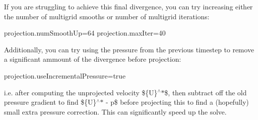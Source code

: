 If you are struggling to achieve this final divergence, you can try increasing either the number of multigrid smooths or number of multigrid iterations\+:

{\ttfamily projection.\+num\+Smooth\+Up=64} {\ttfamily projection.\+max\+Iter=40}

Additionally, you can try using the pressure from the previous timestep to remove a significant ammount of the divergence before projection\+:

{\ttfamily projection.\+use\+Incremental\+Pressure=true}

i.\+e. after computing the unprojected velocity \$\{U\}$^\wedge$$\ast$\$, then subtract off the old pressure gradient to find \$\{U\}$^\wedge$$\ast$ -\/   p\$ before projecting this to find a (hopefully) small extra pressure correction. This can significantly speed up the solve. 
